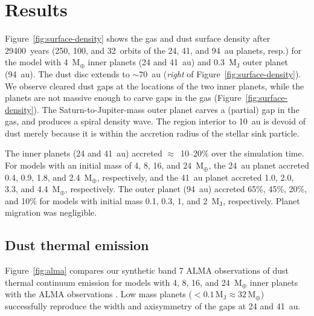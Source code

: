 \documentclass[usenatbib,a4paper,times]{mnras}
\renewcommand{\earth}{\mathrm{M}_{\oplus}}
\begin{document}
\section{Results}
\label{sec:results}

Figure~\ref{fig:surface-density} shows the gas and dust surface density after
29400~years (250, 100, and 32~orbits of the 24, 41, and 94~au planets, resp.)
for the model with 4~$\earth{}$ inner planets (24 and 41~au) and
0.3~$\mathrm{M_J}$ outer planet (94~au). The dust disc extends to $\sim 70$~au
(\textit{right} of Figure~\ref{fig:surface-density}). We observe cleared dust
gaps at the locations of the two inner planets, while the planets are not
massive enough to carve gaps in the gas (Figure~\ref{fig:surface-density}). The
Saturn-to-Jupiter-mass outer planet carves a (partial) gap in the gas, and
produces a spiral density wave. The region interior to 10~au is devoid of dust
merely because it is within the accretion radius of the stellar sink particle.

The inner planets (24 and 41~au) accreted $\approx$~10--20\% over the simulation
time. For models with an initial mass of 4, 8, 16, and 24~$\earth{}$, the 24~au
planet accreted 0.4, 0.9, 1.8, and 2.4~$\earth{}$, respectively, and the 41~au
planet accreted 1.0, 2.0, 3.3, and 4.4~$\earth{}$, respectively. The outer
planet (94~au) accreted 65\%, 45\%, 20\%, and 10\% for models with initial mass
0.1, 0.3, 1, and 2~$\mathrm{M_J}$, respectively. Planet migration was
negligible.




\subsection{Dust thermal emission}

Figure~\ref{fig:alma} compares our synthetic band 7 ALMA observations of dust
thermal continuum emission for models with 4, 8, 16, and 24~$\earth{}$ inner
planets with the ALMA observations \citep{andrews:2016}. Low mass planets ($<
0.1\,\mathrm{M_J} \approx 32\,\earth{}$) successfully reproduce the width and
axisymmetry of the gaps at 24 and 41~au.
\end{document}
